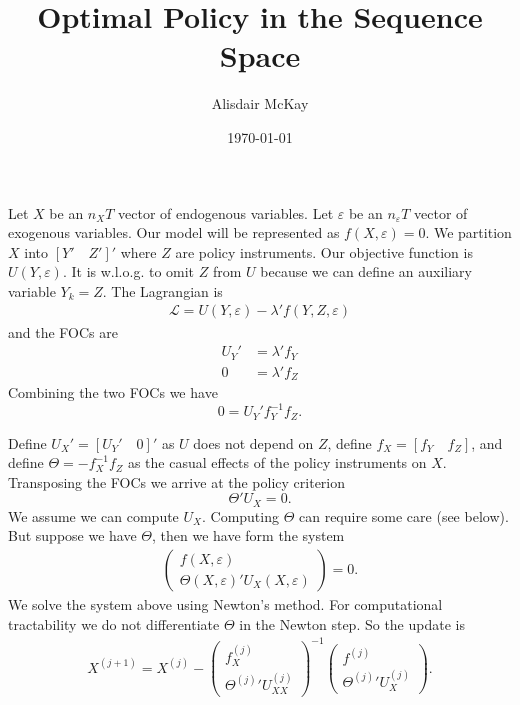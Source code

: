 \documentclass[11pt]{article}
\title{Optimal Policy in the Sequence Space}
\author{Alisdair McKay}
\date{\today}
\begin{document}
\maketitle

Let $X$ be an $n_XT$ vector of endogenous variables. Let $\varepsilon$ be an $n_\varepsilon T$ vector of exogenous variables. 
 Our model will be represented as $f(X,\varepsilon)=0$. We partition $X$ into $[Y' \quad Z']'$ where $Z$ are policy instruments. Our objective function is $U(Y,\varepsilon)$. It is w.l.o.g. to omit $Z$ from $U$ because we can define an auxiliary variable  $Y_k = Z$.  The Lagrangian is
\begin{align*}
	\mathcal L = U(Y,\varepsilon) - \lambda' f(Y,Z,\varepsilon)
\end{align*}
and the FOCs are
\begin{align*}
U_Y' &=\lambda' f_Y \\	
0 &=\lambda' f_Z 
\end{align*}
Combining the two FOCs we have 
\[0 = U_Y' f_Y^{-1} f_Z .\]

Define $U_X' = [U_Y' \quad 0]'$ as $U$ does not depend on $Z$, define $f_X = [f_Y \quad f_Z]$, and define $\Theta = -f_X^{-1} f_Z$ as the casual effects of the policy instruments on $X$. Transposing the FOCs we arrive at the policy criterion
	\[ \Theta' U_X =0.\]
We assume we can compute $U_X$. Computing $\Theta$ can require some care (see below). But suppose we have $\Theta$, then we have form the system
\begin{align*}
	\begin{pmatrix}
		f(X,\varepsilon) \\
		\Theta(X,\varepsilon)' U_X(X,\varepsilon)
	\end{pmatrix}
	=0.
\end{align*}
We solve the system above using Newton's method. For computational tractability we do not differentiate $\Theta$ in the Newton step. So the update is
\begin{align*}
	X^{(j+1)}
=
	X^{(j)}
	-
		\begin{pmatrix}
		f_X^{(j)}  \\
		{\Theta^{(j)}}' U_{XX}^{(j)} 
	\end{pmatrix}^{-1}
	\begin{pmatrix}
		f^{(j)} \\
		{\Theta^{(j)}}'U_X^{(j)}
	\end{pmatrix}.
\end{align*}
\end{document}
